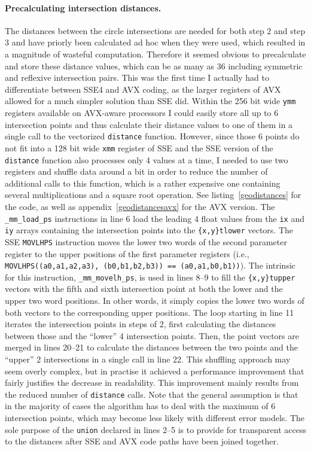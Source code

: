 \paragraph{Precalculating intersection distances.} The distances between the circle intersections are needed for both step 2 and step 3 and have priorly been calculated ad hoc when they were used, which resulted in a magnitude of wasteful computation. Therefore it seemed obvious to precalculate and store these distance values, which can be as many as 36 including symmetric and reflexive intersection pairs. This was the first time I actually had to differentiate between SSE4 and AVX coding, as the larger registers of AVX allowed for a much simpler solution than SSE did. Within the 256 bit wide \texttt{ymm} registers available on AVX-aware processors I could easily store all up to 6 intersection points and thus calculate their distance values to one of them in a single call to the vectorized \texttt{distance} function. However, since those 6 points do not fit into a 128 bit wide \texttt{xmm} register of SSE and the SSE version of the \texttt{distance} function also processes only 4 values at a time, I needed to use two registers and shuffle data around a bit in order to reduce the number of additional calls to this function, which is a rather expensive one containing several multiplications and a square root operation. See listing~\ref{geodistances} for the code, as well as appendix~\ref{geodistancesavx} for the AVX version. The \texttt{\_mm\_load\_ps} instructions in line 6 load the leading 4 float values from the \texttt{ix} and \texttt{iy} arrays containing the intersection points into the \texttt{\{x,y\}tlower} vectors. The SSE \texttt{MOVLHPS} instruction moves the lower two words of the second parameter register to the upper positions of the first parameter registers (i.e., \texttt{MOVLHPS((a0,a1,a2,a3), (b0,b1,b2,b3)) == (a0,a1,b0,b1))}). The intrinsic for this instruction, \texttt{\_mm\_movelh\_ps}, is used in lines 8--9 to fill the \texttt{\{x,y\}tupper} vectors with the fifth and sixth intersection point at both the lower and the upper two word positions. In other words, it simply copies the lower two words of both vectors to the corresponding upper positions. The loop starting in line 11 iterates the intersection points in steps of 2, first calculating the distances between those and the ``lower'' 4 intersection points. Then, the point vectors are merged in lines 20--21 to calculate the distances between the two points and the ``upper'' 2 intersections in a single call in line 22. This shuffling approach may seem overly complex, but in practise it achieved a performance improvement that fairly justifies the decrease in readability. This improvement mainly results from the reduced number of \texttt{distance} calls. Note that the general assumption is that in the majority of cases the algorithm has to deal with the maximum of 6 intersection points, which may become less likely with different error models. The sole purpose of the \texttt{union} declared in lines 2--5 is to provide for transparent access to the distances after SSE and AVX code paths have been joined together.

